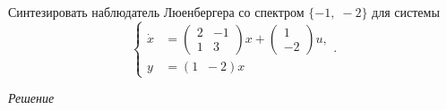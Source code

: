 \documentclass[../../TAU.tex]{subfiles}
\begin{document}
    \examp
    {
        Синтезировать наблюдатель Люенбергера со спектром $\{-1,\; -2\}$ для системы
        $$
            \left\{
            \begin{aligned}
            \dot x &=
            \begin{pmatrix}
            2 & -1\\
            1 & 3
            \end{pmatrix}
             x + \begin{pmatrix}1\\ -2\end{pmatrix}u,\\
            y &= (1\;\; -2) x
            \end{aligned}
            \right..
        $$
    }

    \textit{Решение}
\end{document}
